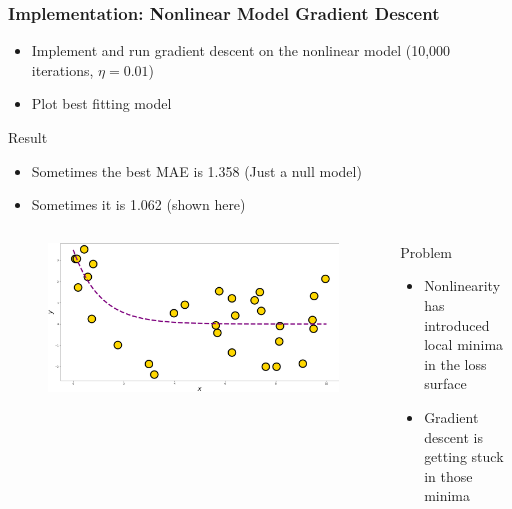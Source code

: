 \documentclass{beamer}
\begin{document}
\begin{frame}
\frametitle{Implementation: Nonlinear Model Gradient Descent}

\begin{itemize}
\item Implement and run gradient descent on the nonlinear model (10,000 iterations, $\eta = 0.01$)
\item Plot best fitting model
\end{itemize}

\begin{exampleblock}{Result}
\begin{itemize}
\item Sometimes the best MAE is 1.358 (Just a null model)
\item Sometimes it is 1.062 (shown here)
\end{itemize}
 \end{exampleblock}
 
 \begin{columns}
 
 \begin{figure}
\includegraphics[width=\textwidth]{../figures/best_nonlinear.png}
\end{figure}


\begin{alertblock}{Problem}

\begin{itemize}
\item Nonlinearity has introduced local minima in the loss surface
\item Gradient descent is getting stuck in those minima
\end{itemize}

\end{alertblock}

 \end{columns}
 


\end{frame}
\end{document}
